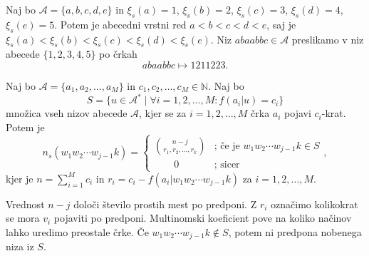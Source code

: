 \documentclass[fin1, tisk]{fmfdelo}
\newcommand{\N}{\mathbb{N}}
\newcommand{\A}{\mathcal{A}}
\theoremstyle{definition}
\begin{document}
\begin{primer}
    Naj bo $\A = \{ a, b, c, d, e \}$ in $\xi_s(a) = 1$, $\xi_s(b) = 2$, $\xi_s(c) = 3$, 
    $\xi_s(d) = 4$, $\xi_s(e) = 5$. Potem je abecedni vrstni red $a < b < c < d < e$, saj je
    $\xi_s(a) < \xi_s(b) < \xi_s(c) < \xi_s(d) < \xi_s(e)$. Niz $\textit{abaabbc} \in \A$ 
    preslikamo v niz abecede $\{ 1, 2, 3, 4, 5\}$ po črkah
    \[
        \textit{abaabbc} \mapsto 1211223.
    \]
\end{primer}

\begin{trditev}
    Naj bo $\A = \{a_1, a_2, \ldots, a_M \}$ in $c_1, c_2, \ldots, c_M \in \N$.
    Naj bo 
    \[
        S = \bigl\{ u \in \A^* \mid \forall i= 1, 2, \ldots, M \colon f(a_i|u) = c_i \bigr\}
    \]
    množica vseh nizov abecede $\A$, kjer se za $i = 1, 2, \ldots, M$ črka
    $a_i$ pojavi $c_i$-krat. Potem je
    \[
        n_s(w_1w_2 \cdots w_{j-1}k) = 
        \begin{cases}
            \binom{n-j}{r_1, r_2, \ldots, r_k} & \text{; če je } w_1w_2 \cdots w_{j-1}k \in S\\
            \qquad 0 & \text{; sicer}
        \end{cases},
    \]
    kjer je $n = \sum_{i=1}^M c_i$ in $r_i = c_i - f(a_i|w_1w_2 \cdots w_{j-1}k)$ za 
    $i = 1, 2, \ldots, M$.
\end{trditev}

\begin{dokaz}
    Vrednost $n-j$ določi število prostih mest po predponi. Z $r_i$ označimo kolikokrat 
    se mora $v_i$ pojaviti po predponi. Multinomski koeficient pove na koliko načinov lahko
    uredimo preostale črke. Če $w_1w_2 \cdots w_{j-1}k \notin S$, potem ni predpona nobenega 
    niza iz $S$.
\end{dokaz}
\end{document}
